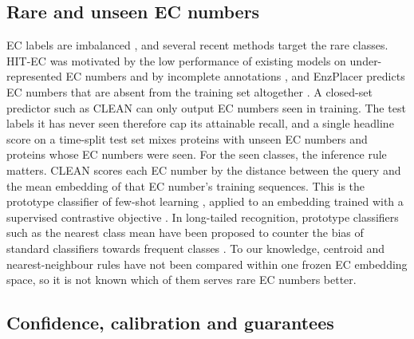 \subsection{Rare and unseen EC numbers}\label{sec:related:rare}

EC labels are imbalanced \citep{Davoudi2026}, and several recent methods target the rare classes. HIT-EC was motivated by the low performance of existing models on under-represented EC numbers and by incomplete annotations \citep{Dumontet2026}, and EnzPlacer predicts EC numbers that are absent from the training set altogether \citep{Ma2026}. A closed-set predictor such as CLEAN can only output EC numbers seen in training. The test labels it has never seen therefore cap its attainable recall, and a single headline score on a time-split test set mixes proteins with unseen EC numbers and proteins whose EC numbers were seen. For the seen classes, the inference rule matters. CLEAN scores each EC number by the distance between the query and the mean embedding of that EC number's training sequences. This is the prototype classifier of few-shot learning \citep{Snell2017}, applied to an embedding trained with a supervised contrastive objective \citep{Khosla2020}. In long-tailed recognition, prototype classifiers such as the nearest class mean have been proposed to counter the bias of standard classifiers towards frequent classes \citep{Sharma2023}. To our knowledge, centroid and nearest-neighbour rules have not been compared within one frozen EC embedding space, so it is not known which of them serves rare EC numbers better.

\subsection{Confidence, calibration and guarantees}\label{sec:related:calibration}

